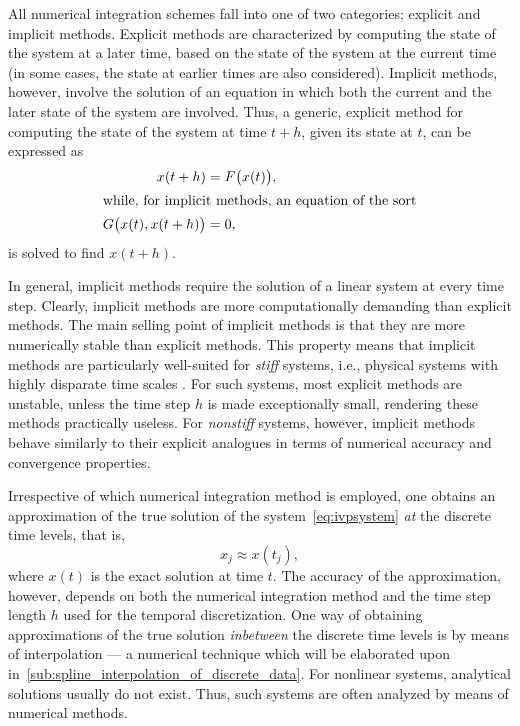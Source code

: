 All numerical integration schemes fall into one of two categories; explicit
and implicit methods. Explicit methods are characterized by computing the state
of the system at a later time, based on the state of the system at the current
time (in some cases, the state at earlier times are also considered). Implicit
methods, however, involve the solution of an equation in which both the
current and the later state of the system are involved. Thus, a generic,
explicit method for computing the state of the system at time $t+h$, given its
state at $t$, can be expressed as
\begin{subequations}
    \label{eq:exim}
    \begin{align}
        \label{eq:exim_ex}
        x(t+h) &= F\big(x(t)\big),\\
        \intertext{while, for implicit methods, an equation of the sort}
        \label{eq:exim_im}
        G\big(x(t),x(t+h)\big)&=0,
    \end{align}
\end{subequations}
is solved to find $x(t+h)$.

In general, implicit methods require the solution of a linear system at every
time step. Clearly, implicit methods are more computationally demanding than
explicit methods. The main selling point of implicit methods is that they are
more numerically stable than explicit methods. This property means that
implicit methods are particularly well-suited for \emph{stiff} systems, i.e.,
physical systems with highly disparate time scales
\parencite[p.2]{hairer1996solving}. For such systems, most explicit methods are
unstable, unless the time step $h$ is made exceptionally small, rendering these
methods practically useless. For \emph{nonstiff} systems, however, implicit
methods behave similarly to their explicit analogues in terms of numerical
accuracy and convergence properties.

Irrespective of which numerical integration method is employed, one obtains
an approximation of the true solution of the system~\eqref{eq:ivpsystem}
\emph{at} the discrete time levels, that is,
\begin{equation}
    \label{eq:num_int_approx_sol}
    x_{j} \approx x(t_{j}),
\end{equation}
where $x(t)$ is the exact solution at time $t$. The accuracy of the
approximation, however, depends on both the numerical integration method and
the time step length $h$ used for the temporal discretization. One way
of obtaining approximations of the true solution \emph{inbetween} the discrete
time levels is by means of interpolation --- a numerical technique which will
be elaborated upon in~\cref{sub:spline_interpolation_of_discrete_data}. For
nonlinear systems, analytical solutions usually do not exist. Thus, such systems
are often analyzed by means of numerical methods.

